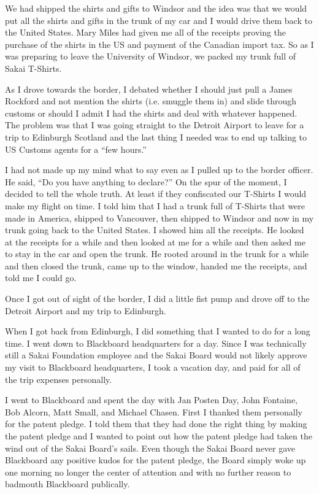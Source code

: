 \documentclass[12pt]{book}
\begin{document}
We had shipped the shirts and gifts to Windsor and the idea was that we would
put all the shirts and gifts in the trunk of my car and I would drive them back
to the United States.  Mary Miles had given me all of the receipts proving the
purchase of the shirts in the US and payment of the Canadian import tax.  So as
I was preparing to leave the University of Windsor, we packed my trunk full of
Sakai T-Shirts.

As I drove towards the border, I debated whether I should just pull a James Rockford and
not mention the shirts (i.e. smuggle them in) and slide through customs or should
I admit I had the shirts and deal with whatever happened.   The problem was that I
was going straight to the Detroit Airport to leave for a trip
to Edinburgh Scotland and the last thing I needed was to end up talking to US Customs
agents for a ``few hours.''

I had not made up my mind what to say even as I pulled up to the border officer.
He said, ``Do you have anything to declare?''  On the spur of the moment,
I decided to tell the whole
truth.  At least if they confiscated our T-Shirts I would make my flight on time.  I told
him that I had a trunk full of T-Shirts that were made in America, shipped to Vancouver,
then shipped to Windsor and now in my trunk going back to the United States.  I showed
him all the receipts.   He looked at the receipts for a while and then looked at me for
a while and then asked me to stay in the car and open the trunk.  He rooted around in the
trunk for a while and then closed the trunk, came up to the window, handed me the receipts,
and told me I could go.

Once I got out of sight of the border, I did a little fist pump and drove off to the Detroit
Airport and my trip to Edinburgh.

When I got back from Edinburgh, I did something that I wanted to do for a long time. I went
down to Blackboard headquarters for a day.  Since I was technically still a Sakai Foundation
employee and the Sakai Board would not likely approve my visit to Blackboard
headquarters, I took a vacation day, and paid for all of the trip expenses personally.

I went to Blackboard and spent the day with Jan Posten Day, John Fontaine, Bob Alcorn, Matt Small,
and Michael Chasen.  First I thanked them personally
for the patent pledge.  I told them that they had done the right thing by making the patent
pledge and I wanted to point out how the patent pledge had taken the wind out
of the Sakai Board's sails.   Even though the Sakai Board never gave Blackboard any positive
kudos for the patent pledge, the Board simply woke up one morning no longer the center of
attention and with no further reason to badmouth Blackboard publically.
\end{document}
